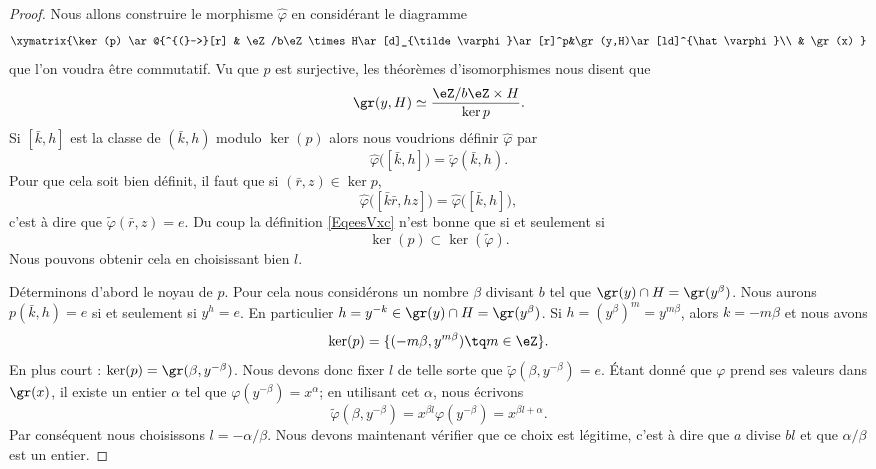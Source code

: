 \begin{proof}
    Nous allons construire le morphisme \( \hat \varphi\) en considérant le diagramme 
    \begin{equation}
    \xymatrix{%
    \ker(p) \ar@{^{(}->}[r]        &   \eZ/b\eZ\times H\ar[d]_{\tilde \varphi}\ar[r]^p&\gr(y,H)\ar[ld]^{\hat \varphi}\\
          &   \gr(x)
       }
    \end{equation}
    que l'on voudra être commutatif. Vu que \( p\) est surjective, les théorèmes d'isomorphismes nous disent que
    \begin{equation}
        \gr(y,H)\simeq\frac{ \eZ/b\eZ\times H }{ \ker p }.
    \end{equation}
    Si \( [\bar k,h]\) est la classe de \( (\bar k,h)\) modulo \( \ker(p)\) alors nous voudrions définir \( \hat \varphi\) par
    \begin{equation}        \label{EqeesVxc}
        \hat\varphi\big( [\bar k,h] \big)=\tilde \varphi(\bar k,h).
    \end{equation}
    Pour que cela soit bien définit, il faut que si \( (\bar r,z)\in \ker p\),
    \begin{equation}
        \hat\varphi\big( [\bar k\bar r,hz] \big)=\hat\varphi\big( [\bar k,h] \big),
    \end{equation}
    c'est à dire que \( \tilde \varphi(\bar r,z)=e\). Du coup la définition \eqref{EqeesVxc} n'est bonne que si et seulement si
    \begin{equation}
        \ker(p)\subset\ker(\tilde\varphi ).
    \end{equation}
    Nous pouvons obtenir cela en choisissant bien \( l\).

    Déterminons d'abord le noyau de \( p\). Pour cela nous considérons un nombre \( \beta\) divisant \( b\) tel que \( \gr(y)\cap H=\gr(y^{\beta})\). Nous aurons \( p(\bar k,h)=e\) si et seulement si \( y^h=e\). En particulier \( h=y^{-k}\in\gr(y)\cap H=\gr(y^{\beta})\). Si \( h=(y^{\beta})^m=y^{m\beta}\), alors \( k=-m\beta\) et nous avons
    \begin{equation}
        \ker(p)=\{ (-m\beta,y^{m\beta})\tq m\in \eZ \}.
    \end{equation}
    En plus court : \( \ker(p)=\gr(\beta,y^{-\beta})\). Nous devons donc fixer \( l\) de telle sorte que \( \tilde \varphi(\beta,y^{-\beta})=e\). Étant donné que \( \varphi\) prend ses valeurs dans \( \gr(x)\), il existe un entier \( \alpha\) tel que \( \varphi(y^{-\beta})=x^{\alpha}\); en utilisant cet \( \alpha\), nous écrivons
    \begin{equation}
        \tilde \varphi(\beta,y^{-\beta})=x^{\beta l}\varphi(y^{-\beta})=x^{\beta l+\alpha}.
    \end{equation}
    Par conséquent nous choisissons \( l=-\alpha/\beta\). Nous devons maintenant vérifier que ce choix est légitime, c'est à dire que \( a\) divise \( bl\) et que \( \alpha/\beta\) est un entier.


\end{proof}

